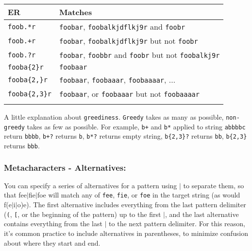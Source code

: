 \begin{footnotesize}
  \begin{tabularx}{\textwidth}{>{\hsize=0.3\hsize}X>{\hsize=0.7\hsize}X}\\
    \hline
    \textbf{ER} & \textbf{Matches} \\
    \hline
    \texttt{foob.*r} & \texttt{foobar}, \texttt{foobalkjdflkj9r} and \texttt{foobr} \\
    \texttt{foob.+r} & \texttt{foobar}, \texttt{foobalkjdflkj9r} but not \texttt{foobr} \\
    \texttt{foob.?r} & \texttt{foobar}, \texttt{foobbr} and \texttt{foobr} but not \texttt{foobalkj9r} \\
    \texttt{fooba\{2\}r} & \texttt{foobaar} \\
    \texttt{fooba\{2,\}r} & \texttt{foobaar}, \texttt{foobaaar}, \texttt{foobaaaar}, ... \\
    \texttt{fooba\{2,3\}r} & \texttt{foobaar}, or \texttt{foobaaar} but not \texttt{foobaaaar} \\
    \hline
    \\
  \end{tabularx}
\end{footnotesize}

A little explanation about \texttt{greediness}. \texttt{Greedy} takes as
many as possible, \texttt{non-greedy} takes as few as possible. For
example, \texttt{b+} and \texttt{b*} applied to string \texttt{abbbbc}
return \texttt{bbbb}, \texttt{b+?} returns \texttt{b}, \texttt{b*?}
returns empty string, \texttt{b\{2,3\}?} returns \texttt{bb},
\texttt{b\{2,3\}} returns \texttt{bbb}.


\subsubsection{Metacharacters - Alternatives:}

You can specify a series of alternatives for a pattern using \texttt{$|$}
to separate them, so that fee$|$fie$|$foe will match any of \texttt{fee},
\texttt{fie}, or \texttt{foe} in the target string (as would f(e$|$i$|$o)e).
The first alternative includes everything from the last pattern delimiter
(\texttt{(}, \texttt{[}, or the beginning of the pattern) up to the first
\texttt{$|$}, and the last alternative contains everything from the last
\texttt{$|$} to the next pattern delimiter. For this reason, it's common
practice to include alternatives in parentheses, to minimize confusion
about where they start and end.

